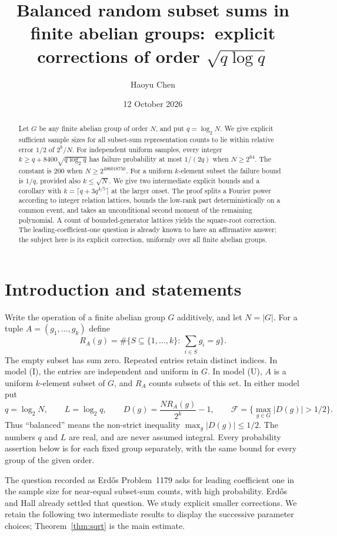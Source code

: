 \documentclass[11pt]{amsart}
\title[Explicit corrections for balanced subset sums]{Balanced random subset sums in finite abelian groups:\ explicit corrections of order $\sqrt{q\log q}$}
\author{Haoyu Chen}
\date{12 October 2026}
\theoremstyle{remark}
\newcommand{\Fail}{\mathcal F}
\begin{document}
\begin{abstract}
Let $G$ be any finite abelian group of order $N$, and put $q=\log_2N$.
We give explicit sufficient sample sizes for all subset-sum representation
counts to lie within relative error $1/2$ of $2^k/N$. For independent
uniform samples, every integer $k\ge q+8400\sqrt{q\log_2q}$ has failure
probability at most $1/(2q)$ when $N\ge2^{64}$. The constant is $200$
when $N\ge2^{486018750}$. For a uniform $k$-element subset the failure
bound is $1/q$, provided also $k\le\sqrt N$. We give two intermediate
explicit bounds and a corollary with $k=\lceil q+3q^{4/5}\rceil$ at the
larger onset. The proof splits a Fourier power according to integer
relation lattices, bounds the low-rank part deterministically on a
common event, and takes an unconditional second moment of the remaining
polynomial. A count of bounded-generator lattices yields the square-root
correction. The leading-coefficient-one question is already known to
have an affirmative answer; the subject here is its explicit correction,
uniformly over all finite abelian groups.
\end{abstract}
\maketitle

\section{Introduction and statements}\label{sec:intro}
Write the operation of a finite abelian group $G$ additively, and let
$N=|G|$. For a tuple $A=(g_1,\ldots,g_k)$ define
\[
 R_A(g)=\#\bigl\{S\subseteq\{1,\ldots,k\}:\ \sum_{i\in S}g_i=g\bigr\}.
\]
The empty subset has sum zero. Repeated entries retain distinct indices.
In model \textup{(I)}, the entries are independent and uniform in $G$.
In model \textup{(U)}, $A$ is a uniform $k$-element subset of $G$, and
$R_A$ counts subsets of this set. In either model put
\[
 q=\log_2N,\qquad L=\log_2q,\qquad
 D(g)=\frac{NR_A(g)}{2^k}-1,\qquad
 \Fail=\{\max_{g\in G}|D(g)|>1/2\}.
\]
Thus ``balanced'' means the non-strict inequality
$\max_g|D(g)|\le1/2$. The numbers $q$ and $L$ are real, and are never
assumed integral. Every probability assertion below is for each fixed
group separately, with the same bound for every group of the given order.

The question recorded as Erd\H{o}s Problem~1179 \cite{EP1179} asks for
leading coefficient one in the sample size for near-equal subset-sum
counts, with high probability. Erd\H{o}s and Hall \cite{EH76} already
settled that question. We study explicit smaller corrections. We retain
the following two intermediate results to display the successive
parameter choices; Theorem~\ref{thm:sqrt} is the main estimate.
\end{document}
